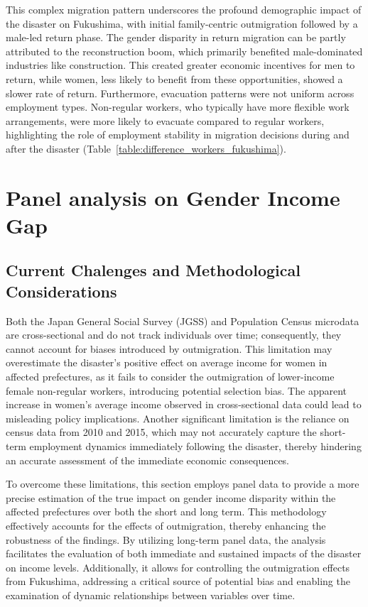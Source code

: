 \documentclass[a4paper,12pt]{article}
\begin{document}
This complex migration pattern underscores the profound demographic impact of the disaster on Fukushima, with initial family-centric outmigration followed by a male-led return phase. The gender disparity in return migration can be partly attributed to the reconstruction boom, which primarily benefited male-dominated industries like construction. This created greater economic incentives for men to return, while women, less likely to benefit from these opportunities, showed a slower rate of return. Furthermore, evacuation patterns were not uniform across employment types. Non-regular workers, who typically have more flexible work arrangements, were more likely to evacuate compared to regular workers, highlighting the role of employment stability in migration decisions during and after the disaster (Table~\ref{table:difference_workers_fukushima}).

\section{Panel analysis on Gender Income Gap}

\subsection{Current Chalenges and Methodological Considerations}

Both the Japan General Social Survey (JGSS) and Population Census microdata are cross-sectional and do not track individuals over time; consequently, they cannot account for biases introduced by outmigration. This limitation may overestimate the disaster's positive effect on average income for women in affected prefectures, as it fails to consider the outmigration of lower-income female non-regular workers, introducing potential selection bias. The apparent increase in women's average income observed in cross-sectional data could lead to misleading policy implications. Another significant limitation is the reliance on census data from 2010 and 2015, which may not accurately capture the short-term employment dynamics immediately following the disaster, thereby hindering an accurate assessment of the immediate economic consequences.


To overcome these limitations, this section employs panel data to provide a more precise estimation of the true impact on gender income disparity within the affected prefectures over both the short and long term. This methodology effectively accounts for the effects of outmigration, thereby enhancing the robustness of the findings. By utilizing long-term panel data, the analysis facilitates the evaluation of both immediate and sustained impacts of the disaster on income levels. Additionally, it allows for controlling the outmigration effects from Fukushima, addressing a critical source of potential bias and enabling the examination of dynamic relationships between variables over time.
\end{document}
